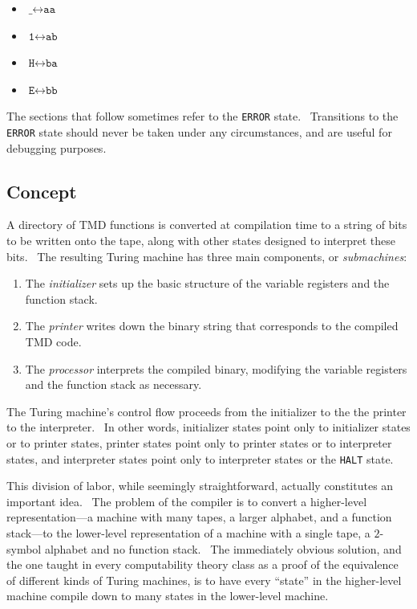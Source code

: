 \documentclass[11pt]{article}
\begin{document}
\begin{itemize}
\item $\texttt{\_} \leftrightarrow \texttt{aa}$
\item $\texttt{1} \leftrightarrow \texttt{ab}$
\item $\texttt{H} \leftrightarrow \texttt{ba}$
\item $\texttt{E} \leftrightarrow \texttt{bb}$
\end{itemize}

The sections that follow sometimes refer to the \texttt{ERROR} state. \ Transitions to the \texttt{ERROR} state should never be taken under any circumstances, and are useful for debugging purposes.

\subsection{Concept} \label{sec:ontape}

A directory of TMD functions is converted at compilation time to a string of bits to be written onto the tape, along with other states designed to interpret these bits. \ The resulting Turing machine has three main components, or \emph{submachines}:

\begin{enumerate}
\item The \emph{initializer} sets up the basic structure of the variable registers and the function stack.
\item The \emph{printer} writes down the binary string that corresponds to the compiled TMD code.
\item The \emph{processor} interprets the compiled binary, modifying the variable registers and the function stack as necessary.
\end{enumerate}

The Turing machine's control flow proceeds from the initializer to the the printer to the interpreter. \ In other words, initializer states point only to initializer states or to printer states, printer states point only to printer states or to interpreter states, and interpreter states point only to interpreter states or the \texttt{HALT} state.

This division of labor, while seemingly straightforward, actually constitutes an important idea. \ The problem of the compiler is to convert a higher-level representation---a machine with many tapes, a larger alphabet, and a function stack---to the lower-level representation of a machine with a single tape, a $2$-symbol alphabet and no function stack. \ The immediately obvious solution, and the one taught in every computability theory class as a proof of the equivalence of different kinds of Turing machines, is to have every ``state'' in the higher-level machine compile down to many states in the lower-level machine. %
\end{document}
